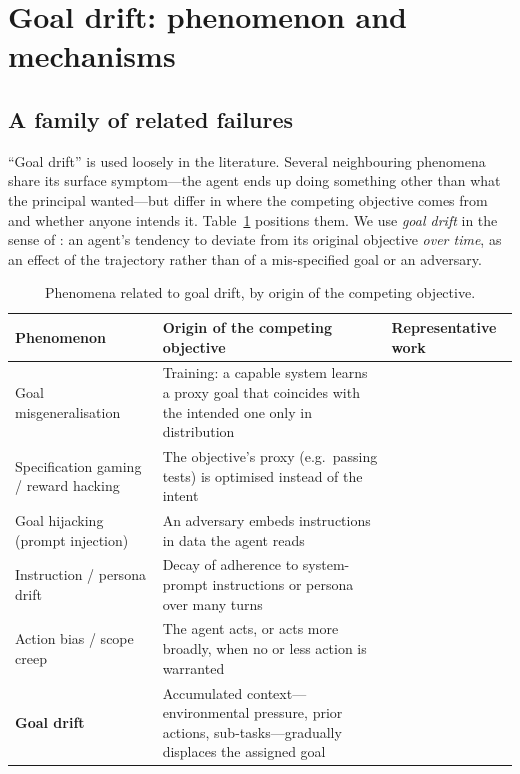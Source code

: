 \section{Goal drift: phenomenon and mechanisms}
\label{sec:drift}

\subsection{A family of related failures}

``Goal drift'' is used loosely in the literature. Several neighbouring phenomena share its surface
symptom---the agent ends up doing something other than what the principal wanted---but differ in
where the competing objective comes from and whether anyone intends it. Table~\ref{tab:phenomena}
positions them. We use \emph{goal drift} in the sense of \citet{arike2025goaldrift}: an agent's
tendency to deviate from its original objective \emph{over time}, as an effect of the trajectory
rather than of a mis-specified goal or an adversary.

\begin{table}[t]
\centering
\small
\begin{tabularx}{\linewidth}{@{}>{\raggedright\arraybackslash}p{3.2cm}>{\raggedright\arraybackslash}X>{\raggedright\arraybackslash}p{4.2cm}@{}}
\toprule
Phenomenon & Origin of the competing objective & Representative work \\
\midrule
Goal misgeneralisation & Training: a capable system learns a proxy goal that coincides with
the intended one only in distribution & \citet{langosco2022goalmisgen,shah2022goalmisgen} \\
Specification gaming / reward hacking & The objective's proxy (e.g.\ passing tests) is optimised
instead of the intent & \citet{amodei2016concrete,zhong2025impossiblebench} \\
Goal hijacking (prompt injection) & An adversary embeds instructions in data the agent reads &
\citet{zhan2024injecagent,debenedetti2024agentdojo} \\
Instruction / persona drift & Decay of adherence to system-prompt instructions or persona over many
turns & \citet{li2024instability,ding2026contextecho} \\
Action bias / scope creep & The agent acts, or acts more broadly, when no or less action is
warranted & \citet{gloaguen2026fixedbench,mavali2026tab} \\
\textbf{Goal drift} & Accumulated context---environmental pressure, prior actions, sub-tasks---gradually
displaces the assigned goal & \citet{arike2025goaldrift,menon2026inherited,saebo2026asymmetric} \\
\bottomrule
\end{tabularx}
\caption{Phenomena related to goal drift, by origin of the competing objective.}
\label{tab:phenomena}
\end{table}

